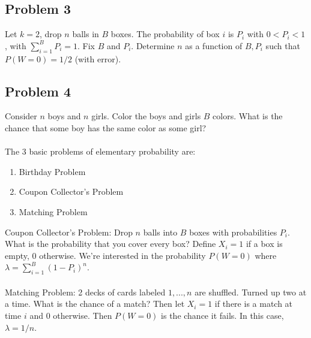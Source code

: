 \documentclass[12pt]{article}
\begin{document}
\subsection{Problem 3}
Let $k = 2$, drop $n$ balls in $B$ boxes.  The probability of box $i$ is $P_i$ with $0 < P_i < 1$, with $\sum_{i=1}^B P_i = 1$.  Fix $B$ and $P_i$.  Determine $n$ as a function of $B, P_i$ such that $P(W = 0) = 1/2$ (with error).

\subsection{Problem 4}
Consider $n$ boys and $n$ girls.  Color the boys and girls $B$ colors.  What is the chance that some boy has the same color as some girl?
\\ \\
The 3 basic problems of elementary probability are:
\begin{enumerate}
\item Birthday Problem
\item Coupon Collector's Problem
\item Matching Problem
\end{enumerate}

Coupon Collector's Problem: Drop $n$ balls into $B$ boxes with probabilities $P_i$.  What is the probability that you cover every box?  Define $X_i = 1$ if a box is empty, $0$ otherwise.  We're interested in the probability $P(W = 0)$ where $\lambda = \sum_{i=1}^B ( 1 - P_i)^n$.
\\ \\
Matching Problem: 2 decks of cards labeled $1, ..., n$ are shuffled.  Turned up two at a time.  What is the chance of a match?  Then let $X_i = 1$ if there is a match at time $i$ and $0$ otherwise.  Then $P(W = 0)$ is the chance it fails.  In this case, $\lambda = 1/n$.
\\ \\
\end{document}
